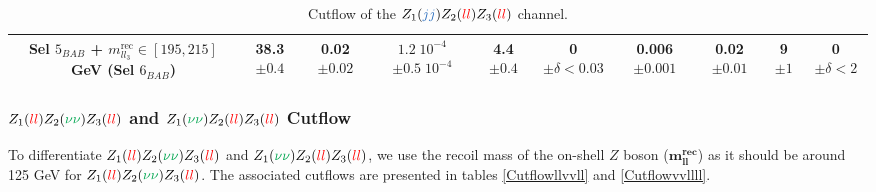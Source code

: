 \documentclass[a4paper,11pt]{article}
\begin{document}
\begin{table}[h!]
\begin{adjustbox}{width=1\textwidth}
\begin{tabular}{|c|c|c|c|c|c|c|c|c|c|}
            \thead{Sel $5_{BAB}$ + $m^{\mbox{rec}}_{ll_3}\in[195,215]$ GeV \\ (Sel $6_{BAB}$)} & \thead{38.3\\$\pm0.4$} & \thead{0.02\\$\pm0.02$} & \thead{$1.2\;10^{-4}$\\$\pm0.5\;10^{-4}$} & \thead{4.4\\$\pm0.4$} & \thead{0\\$\pm\delta<0.03$} & \thead{0.006\\$\pm0.001$} & \thead{0.02\\$\pm0.01$} & \thead{9\\$\pm1$} & \thead{0\\$\pm\delta<2$} \\
            \hline
        \end{tabular}
        \end{adjustbox}
        \caption{Cutflow of the $Z_1(\textcolor{NavyBlue}{jj})Z_2(\textcolor{red}{ll})Z_3(\textcolor{red}{ll})$ channel.}
        \label{Cutflowjjllll}
    \end{table}

    \noindent
    \subsubsection[$Z_1(\textcolor{red}{ll})Z_2(\textcolor{Green}{\nu\nu})Z_3(\textcolor{red}{ll})$ and $Z_1(\textcolor{Green}{\nu\nu})Z_2(\textcolor{red}{ll})Z_3(\textcolor{red}{ll})$ Cutflow]{\boldmath$Z_1(\textcolor{red}{ll})Z_2(\textcolor{Green}{\nu\nu})Z_3(\textcolor{red}{ll})$ and $Z_1(\textcolor{Green}{\nu\nu})Z_2(\textcolor{red}{ll})Z_3(\textcolor{red}{ll})$ Cutflow}
    To differentiate $Z_1(\textcolor{red}{ll})Z_2(\textcolor{Green}{\nu\nu})Z_3(\textcolor{red}{ll})$ and $Z_1(\textcolor{Green}{\nu\nu})Z_2(\textcolor{red}{ll})Z_3(\textcolor{red}{ll})$, we use the recoil mass of the on-shell $Z$ boson ($\boldsymbol{m^{\mbox{rec}}_{ll}}$) as it should be around 125 GeV for $Z_1(\textcolor{red}{ll})Z_2(\textcolor{Green}{\nu\nu})Z_3(\textcolor{red}{ll})$. The associated cutflows are presented in tables \ref{Cutflowllvvll} and \ref{Cutflowvvllll}.
    
\end{document}
